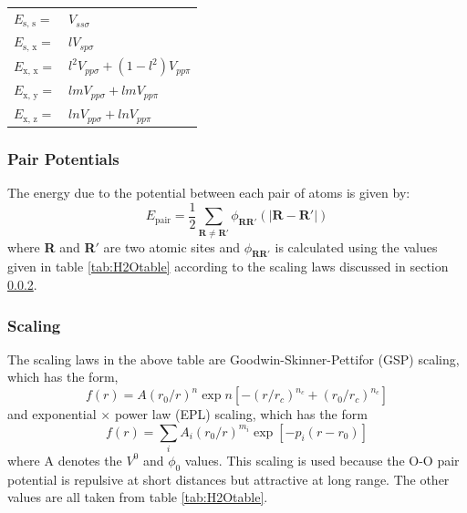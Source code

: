 \documentclass{article}
\begin{document}
\begin{multicols}{2}
\begin{center}
	\label{tab:Slater-Koster}
	\begin{tabularx}{\linewidth}{XX}
		\hline
		$E_{\text{s, s}} =$ & $V_{ss\sigma} $ \\
		$E_{\text{s, x}} =$ & $lV_{sp\sigma} $ \\
		$E_{\text{x, x}} =$ & $l^{2}V_{pp\sigma} +(1-l^{2})V_{pp\pi}$ \\
		$E_{\text{x, y}} =$ & $lmV_{pp\sigma} + lmV_{pp\pi}$ \\
		$E_{\text{x, z}} =$ & $lnV_{pp\sigma} + lnV_{pp\pi}$ \\
		\hline 
	\end{tabularx}
\end{center}

\subsubsection{Pair Potentials}
The energy due to the potential between each pair of atoms is given by:
\begin{equation}
	E_{\text{pair}}=\frac{1}{2}\sum_{\textbf{R} \neq \textbf{R}'}\phi_{\textbf{RR}'}(|\textbf{R}-\textbf{R}'|)
\end{equation}
where \textbf{R} and \textbf{R}$'$ are two atomic sites and $\phi_{\textbf{R}\textbf{R}'}$ is calculated using the values given in table \ref{tab:H2Otable} according to the scaling laws discussed in section \ref{sec:scaling}.\cite{Sheppard2014}

\subsubsection{Scaling}
\label{sec:scaling}
The scaling laws in the above table are Goodwin-Skinner-Pettifor (GSP) scaling,\cite{Goodwin1989} which has the form,
\begin{equation}
	f(r)=A(r_{0}/r)^{n}\exp{n[-(r/r_{c})^{n_{c}}+(r_{0}/r_{c})^{n_{c}}]}
\end{equation}
and exponential $\times$ power law (EPL) scaling,\cite{Lozovoi2014} which has the form
\begin{equation}
	f(r)=\sum_i A_{i}(r_{0}/r)^{m_{i}}\exp[-p_{i}(r-r_{0})]
\end{equation}
where A denotes the $V^0$ and $\phi_{0}$ values. This scaling is used because the O-O pair potential is repulsive at short distances but attractive at long range. The other values are all taken from table \ref{tab:H2Otable}.


\end{multicols}
\end{document}
